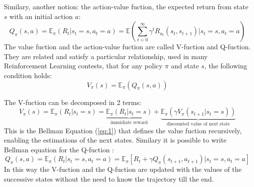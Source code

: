 \documentclass[14pt]{extarticle}
\def\ppn{\vspace{10pt}}
\begin{document}
\begin{flushleft}
Similary, another notion: the action-value fuction, the expected return from state $s$ with an initial action $a$:
\[Q_{\pi}(s,a) = \mathbb{E}_{\pi}(R_t|s_t=s, a_t=a) = \mathbb{E}(\sum_{t=0}^{\infty} \gamma^t R_{a_t}(s_t, s_{t+1})|s_t=s,a_t=a)\]
The value fuction and the action-value fuction are called V-fuction and Q-fuction. They are related and satisfy a particular relationship, used in many Reinforcement Learning contests, that for any policy $\pi$ and state $s$, the following condition holds:
\[V_{\pi}(s) = \mathbb{E}_{\pi}(Q_{\pi}(s,a))\]

\ppn
The V-fuction can be decomposed in 2 terms:
\begin{equation} \label{eq:1}
V_{\pi}(s) = \mathbb{E}_{\pi}(R_t|s_t=s) = 
					\underbrace{\mathbb{E}_{\pi}(R_{t}|s_t=s)}_{\text{immidiate reward}} + 
					\underbrace{\mathbb{E}_{\pi}(\gamma V_{\pi}(s_{t+1}|s_t=s))}_{\text{discounted value of next state}}
\end{equation}
This is the Bellman Equation (\ref{eq:1}) that defines the value fuction recursively, enabling the estimations of the next states.
Similary it is possible to write Bellman equation for the Q-fuction :
\[Q_{\pi}(s,a) = \mathbb{E}_{\pi}(R_t|s_t=s, a_t=a) = \mathbb{E}_{\pi}[R_t + \gamma Q_{\pi}(s_{t+1},a_{t+1})| s_t=s, a_t=a] \]
In this way the V-fuction and the  Q-fuction are updated with the values of the successive states without the need to know the trajectory till the end.


\end{flushleft}
\end{document}
